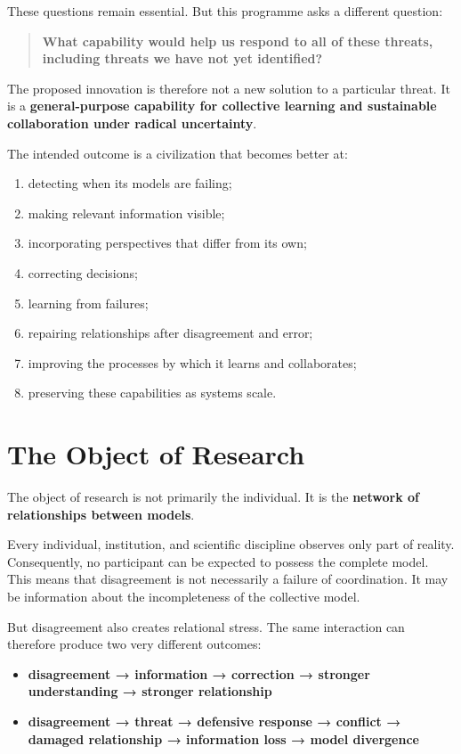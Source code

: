 \documentclass{article}
\begin{document}
These questions remain essential. But this programme asks a different question:
\begin{quote}
    \textbf{What capability would help us respond to all of these threats, including threats we have not yet identified?}
\end{quote}

The proposed innovation is therefore not a new solution to a particular threat. It is a \textbf{general-purpose capability for collective learning and sustainable collaboration under radical uncertainty}.

The intended outcome is a civilization that becomes better at:
\begin{enumerate}
    \item detecting when its models are failing;
    \item making relevant information visible;
    \item incorporating perspectives that differ from its own;
    \item correcting decisions;
    \item learning from failures;
    \item repairing relationships after disagreement and error;
    \item improving the processes by which it learns and collaborates;
    \item preserving these capabilities as systems scale.
\end{enumerate}

\section{The Object of Research}
The object of research is not primarily the individual. It is the \textbf{network of relationships between models}.

Every individual, institution, and scientific discipline observes only part of reality. Consequently, no participant can be expected to possess the complete model. This means that disagreement is not necessarily a failure of coordination. It may be information about the incompleteness of the collective model.

But disagreement also creates relational stress. The same interaction can therefore produce two very different outcomes:
\begin{itemize}
    \item \textbf{disagreement → information → correction → stronger understanding → stronger relationship}
    \item \textbf{disagreement → threat → defensive response → conflict → damaged relationship → information loss → model divergence}
\end{itemize}
\end{document}
